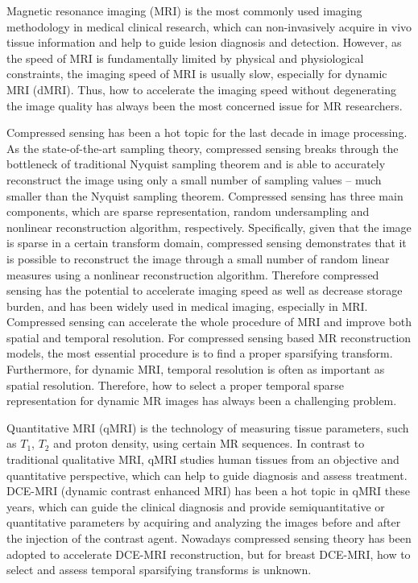 \begin{englishabstract}
Magnetic resonance imaging (MRI) is the most commonly used imaging methodology in medical clinical research, which can non-invasively acquire in vivo tissue information and help to guide lesion diagnosis and detection. However, as the speed of MRI is fundamentally limited by physical and physiological constraints, the imaging speed of MRI is usually slow, especially for dynamic MRI (dMRI). Thus, how to accelerate the imaging speed without degenerating the image quality has always been the most concerned issue for MR researchers.

Compressed sensing has been a hot topic for the last decade in image processing. As the state-of-the-art sampling theory, compressed sensing breaks through the bottleneck of traditional Nyquist sampling theorem and is able to accurately reconstruct the image using only a small number of sampling values -- much smaller than the Nyquist sampling theorem. Compressed sensing has three main components, which are sparse representation, random undersampling and nonlinear reconstruction algorithm, respectively. Specifically, given that the image is sparse in a certain transform domain, compressed sensing demonstrates that it is possible to reconstruct the image through a small number of random linear measures using a nonlinear reconstruction algorithm. Therefore compressed sensing has the potential to accelerate imaging speed as well as decrease storage burden, and has been widely used in medical imaging, especially in MRI. Compressed sensing can accelerate the whole procedure of MRI and improve both spatial and temporal resolution. For compressed sensing based MR reconstruction models, the most essential procedure is to find a proper sparsifying transform. Furthermore, for dynamic MRI, temporal resolution is often as important as spatial resolution. Therefore, how to select a proper temporal sparse representation for dynamic MR images has always been a challenging problem.

Quantitative MRI (qMRI) is the technology of measuring tissue parameters, such as $T_1$, $T_2$ and proton density, using certain MR sequences. In contrast to traditional qualitative MRI, qMRI studies human tissues from an objective and quantitative perspective, which can help to guide diagnosis and assess treatment. DCE-MRI (dynamic contrast enhanced MRI) has been a hot topic in qMRI these years, which can guide the clinical diagnosis and provide semiquantitative or quantitative parameters by acquiring and analyzing the images before and after the injection of the contrast agent. Nowadays compressed sensing theory has been adopted to accelerate DCE-MRI reconstruction, but for breast DCE-MRI, how to select and assess temporal sparsifying transforms is unknown.


\end{englishabstract}

